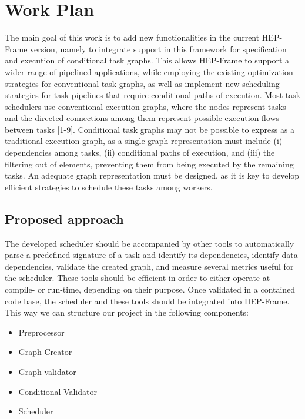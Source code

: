 \chapter{Work Plan}

The main goal of this work is to add new functionalities in the current HEP-Frame version, namely to integrate support in this framework for specification and execution of conditional task graphs. This allows HEP-Frame to support a wider range of pipelined applications, while employing the existing optimization strategies for conventional task graphs, as well as implement new scheduling strategies for task pipelines that require conditional paths of execution.
Most task schedulers use conventional execution graphs, where  the nodes represent tasks and the directed connections among them represent possible execution flows between tasks [1-9]. Conditional task graphs may not be possible to express as a traditional execution graph, as a single graph representation must include (i) dependencies among tasks, (ii) conditional paths of execution, and (iii) the filtering out of elements, preventing them from being executed by the remaining tasks. An adequate graph representation must be designed, as it is key to develop efficient strategies to schedule these tasks among workers.

\section{Proposed approach}



The developed scheduler should be accompanied by other tools to automatically parse a predefined signature of a task and identify its dependencies, identify data dependencies, validate the created graph, and measure several metrics useful for the scheduler. These tools should be efficient in order to either operate at compile- or run-time, depending on their purpose. Once validated in a contained code base, the scheduler and these tools should be integrated into HEP-Frame.
This way we can structure our project in the following components:
\begin{itemize}
    \item Preprocessor
    \item Graph Creator
    \item Graph validator
    \item Conditional Validator
    \item Scheduler
\end{itemize}

